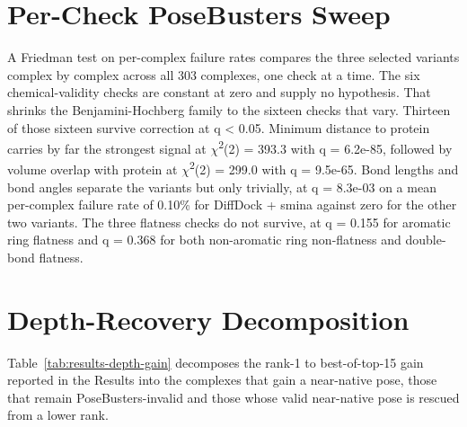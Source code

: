 \hypertarget{per-check-posebusters-sweep}{%
\section{Per-Check PoseBusters Sweep}\label{per-check-posebusters-sweep}}

A Friedman test on per-complex failure rates compares the three selected variants complex by complex across all 303 complexes, one check at a time. The six chemical-validity checks are constant at zero and supply no hypothesis. That shrinks the Benjamini-Hochberg family to the sixteen checks that vary. Thirteen of those sixteen survive correction at q \textless{} 0.05. Minimum distance to protein carries by far the strongest signal at \ensuremath{\chi}\textsuperscript{2}(2) = 393.3 with q = 6.2e-85, followed by volume overlap with protein at \ensuremath{\chi}\textsuperscript{2}(2) = 299.0 with q = 9.5e-65. Bond lengths and bond angles separate the variants but only trivially, at q = 8.3e-03 on a mean per-complex failure rate of 0.10\% for DiffDock + smina against zero for the other two variants. The three flatness checks do not survive, at q = 0.155 for aromatic ring flatness and q = 0.368 for both non-aromatic ring non-flatness and double-bond flatness.

\hypertarget{depth-recovery-decomposition}{%
\section{Depth-Recovery Decomposition}\label{depth-recovery-decomposition}}

Table~\ref{tab:results-depth-gain} decomposes the rank-1 to best-of-top-15 gain reported in the Results into the complexes that gain a near-native pose, those that remain PoseBusters-invalid and those whose valid near-native pose is rescued from a lower rank.

